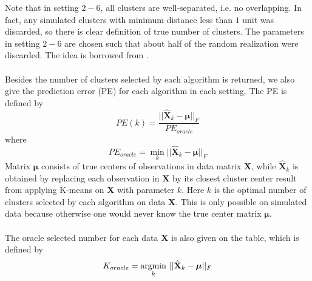 \documentclass[11pt]{article}
\begin{document}
Note that in setting $2-6$, all clusters are well-separated, i.e. no overlapping. In fact, any simulated clusters with minimum distance less than $1$ unit was discarded, so there is clear definition of true number of clusters. The parameters in setting $2-6$ are chosen such that about half of the random realization were discarded. The idea is borrowed from \cite{tibshirani2001estimating}.\\\\
Besides the number of clusters selected by each algorithm is returned, we also give the prediction error (PE) for each algorithm in each setting. The PE is defined by 
\[ PE(k) = \frac{||\hat{\mathbf{X}}_k- \boldsymbol{\mu} ||_F}{PE_{oracle}} \]
where \[PE_{oracle} = \min_k ||\hat{\mathbf{X}}_k- \boldsymbol{\mu} ||_F\]
Matrix $\boldsymbol{\mu}$ consists of true centers of observations in data matrix $\mathbf{X}$, while $\hat{\mathbf{X}}_k$ is obtained by replacing each observation in $\mathbf{X}$ by its closest cluster center result from applying K-means on $\mathbf{X}$ with parameter $k$. Here $k$ is the optimal number of clusters selected by each algorithm on data $\mathbf{X}$. This is only possible on simulated data because otherwise one would never know the true center matrix $\boldsymbol{\mu}$.\\\\
The oracle selected number for each data $\mathbf{X}$ is also given on the table, which is defined by 
\[ K_{oracle} =  \underset{k}{\operatorname{argmin}}\hspace{0.05in} ||\hat{\mathbf{X}}_k- \boldsymbol{\mu} ||_F \]
\end{document}

